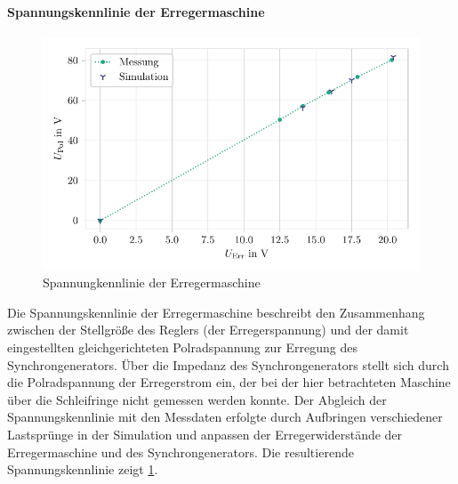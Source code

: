\paragraph{Spannungskennlinie der Erregermaschine}
\begin{figure}[h!]
    \centering
    \includegraphics{Bilder/Validierung_Erregermaschine.pdf}
    \caption{Spannungkennlinie der Erregermaschine}
    \label{fig:Validierung-Erregermaschine}
\end{figure}
Die Spannungskennlinie der Erregermaschine beschreibt den Zusammenhang zwischen der Stellgröße des Reglers (der Erregerspannung) und der damit eingestellten gleichgerichteten Polradspannung zur Erregung des Synchrongenerators. Über die Impedanz des Synchrongenerators stellt sich durch die Polradspannung der Erregerstrom ein, der bei der hier betrachteten Maschine über die Schleifringe nicht gemessen werden konnte. Der Abgleich der Spannungskennlinie mit den Messdaten erfolgte durch Aufbringen verschiedener Lastsprünge in der Simulation und anpassen der Erregerwiderstände der Erregermaschine und des Synchrongenerators. Die resultierende Spannungskennlinie zeigt \cref{fig:Validierung-Erregermaschine}.

